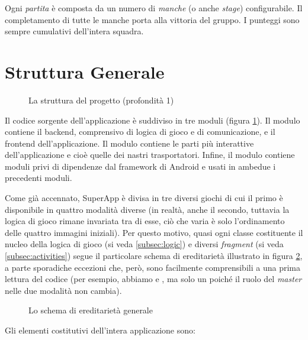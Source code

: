 Ogni \textit{partita} è composta da un numero di \textit{manche} (o anche \textit{stage}) configurabile. Il completamento di tutte le manche porta alla vittoria del gruppo. I punteggi sono sempre cumulativi dell'intera squadra.

\section{Struttura Generale}

\begin{figure}[h!]
\caption{La struttura del progetto (profondità 1)}
\label{fig:tree_root}
\end{figure}

Il codice sorgente dell'applicazione è suddiviso in tre moduli (figura \ref{fig:tree_root}). Il modulo  contiene il backend, comprensivo di logica di gioco e di comunicazione, e il frontend dell'applicazione. Il modulo  contiene le parti più interattive dell'applicazione e cioè quelle dei nastri trasportatori. Infine, il modulo  contiene moduli privi di dipendenze dal framework di Android e usati in ambedue i precedenti moduli.

Come già accennato, SuperApp è divisa in tre diversi giochi di cui il primo è disponibile in quattro modalità diverse (in realtà, anche il secondo, tuttavia la logica di gioco rimane invariata tra di esse, ciò che varia è solo l'ordinamento delle quattro immagini iniziali). Per questo motivo, quasi ogni classe costituente il nucleo della logica di gioco (si veda \ref{subsec:logic}) e diversi \textit{fragment} (si veda \ref{subsec:activities}) segue il particolare schema di ereditarietà illustrato in figura \ref{fig:hierarchy}, a parte sporadiche eccezioni che, però, sono facilmente comprensibili a una prima lettura del codice (per esempio, abbiamo  e , ma solo un  poiché il ruolo del \textit{master} nelle due modalità non cambia).

\begin{figure}[h!]
\caption{Lo schema di ereditarietà generale}
\label{fig:hierarchy}
\end{figure}

Gli elementi costitutivi dell'intera applicazione sono:

